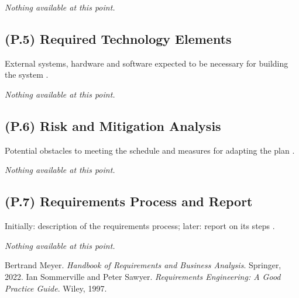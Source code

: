 \documentclass[12pt,letterpaper]{article}
\begin{document}
\textit{Nothing available at this point.}

\subsection{(P.5) Required Technology Elements}
External systems, hardware and software expected to be necessary for building the system \cite{meyer2022}.

\textit{Nothing available at this point.}

\subsection{(P.6) Risk and Mitigation Analysis}
Potential obstacles to meeting the schedule and measures for adapting the plan \cite{meyer2022}.

\textit{Nothing available at this point.}

\subsection{(P.7) Requirements Process and Report}
Initially: description of the requirements process; later: report on its steps \cite{meyer2022}.

\textit{Nothing available at this point.}

\clearpage

\begin{thebibliography}{9}
 Bertrand Meyer. \textit{Handbook of Requirements and Business Analysis}. Springer, 2022.
 Ian Sommerville and Peter Sawyer. \textit{Requirements Engineering: A Good Practice Guide}. Wiley, 1997.
\end{thebibliography}
\end{document}
